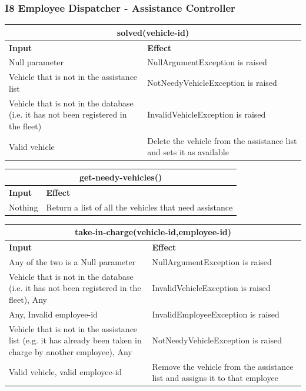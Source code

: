 \documentclass{article}
\begin{document}
\subsubsection{I8 Employee Dispatcher - Assistance Controller}
\begin{tabular}{ |p{5cm}|p{7cm}| }
  \hline
  \multicolumn{2}{|c|}{solved(vehicle-id)} \\
  \hline
  \textbf{Input} & \textbf{Effect} \\
  \hline
  Null parameter & NullArgumentException is raised\\
  \hline
  Vehicle that is not in the assistance list & NotNeedyVehicleException is raised\\
  \hline
  Vehicle that is not in the database (i.e. it has not been registered in the fleet) & InvalidVehicleException is raised\\
  \hline
  Valid vehicle & Delete the vehicle from the assistance list and sets it as available\\
  \hline
\end{tabular}
\newline
\begin{tabular}{ |p{5cm}|p{7cm}| }
  \hline
  \multicolumn{2}{|c|}{get-needy-vehicles()} \\
  \hline
  \textbf{Input} & \textbf{Effect} \\
  \hline
  Nothing & Return a list of all the vehicles that need assistance\\
  \hline
\end{tabular}
\newline
\begin{tabular}{ |p{5cm}|p{7cm}| }
  \hline
  \multicolumn{2}{|c|}{take-in-charge(vehicle-id,employee-id)} \\
  \hline
  \textbf{Input} & \textbf{Effect} \\
  \hline
  Any of the two is a Null parameter & NullArgumentException is raised\\
  \hline
 Vehicle that is not in the database (i.e. it has not been registered in the fleet), Any & InvalidVehicleException is raised\\
  \hline
  Any, Invalid employee-id & InvalidEmployeeException is raised\\
  \hline
  Vehicle that is not in the assistance list (e.g. it has already been taken in charge by another employee), Any & NotNeedyVehicleException is raised\\
  \hline
  Valid vehicle, valid employee-id & Remove the vehicle from the assistance list and assigns it to that employee\\
  \hline
\end{tabular}
\end{document}
